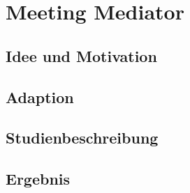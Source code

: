 \section{Meeting Mediator}


\subsection{Idee und Motivation}


\subsection{Adaption}


\subsection{Studienbeschreibung}


\subsection{Ergebnis}
